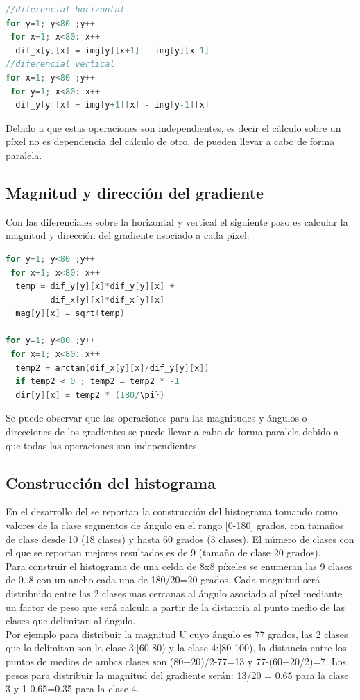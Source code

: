 \documentclass{article}
\begin{document}
\begin{lstlisting}[language=C, caption=Calculo de la imagen diferencial]
//diferencial horizontal
for y=1; y<80 ;y++
 for x=1; x<80: x++
  dif_x[y][x] = img[y][x+1] - img[y][x-1]
//diferencial vertical
for x=1; y<80 ;y++
 for y=1; x<80: x++
  dif_y[y][x] = img[y+1][x] - img[y-1][x]  

\end{lstlisting}
Debido a que estas operaciones son independientes, es decir el cálculo sobre un píxel no es dependencia del cálculo de otro, de pueden llevar a cabo de forma paralela.

\subsection*{Magnitud y dirección del gradiente}
Con las diferenciales sobre la horizontal y vertical el siguiente paso es calcular la magnitud y dirección del gradiente asociado a cada píxel. 

\begin{lstlisting}[language=C, caption=Calculo de la imagen magnitud y direcciones]
for y=1; y<80 ;y++
 for x=1; x<80: x++
  temp = dif_y[y][x]*dif_y[y][x] +
         dif_x[y][x]*dif_x[y][x]
  mag[y][x] = sqrt(temp)

for y=1; y<80 ;y++
 for x=1; x<80: x++
  temp2 = arctan(dif_x[y][x]/dif_y[y][x])
  if temp2 < 0 ; temp2 = temp2 * -1 
  dir[y][x] = temp2 * (180/\pi})

\end{lstlisting}

Se puede observar que las operaciones para las magnitudes y ángulos o direcciones de los gradientes se puede llevar a cabo de forma paralela debido a que todas las operaciones son independientes 

\subsection*{Construcción del histograma}
En el desarrollo del \cite{dalal-triggs} se reportan la construcción del histograma tomando como valores de la clase segmentos de ángulo en el rango [0-180] grados, con tamaños de clase desde 10 (18 clases) y hasta 60 grados (3 clases). El número de clases con el que se reportan mejores resultados es de 9 (tamaño de clase 20 grados). \\

Para construir el histograma de una celda de 8x8 píxeles se enumeran las 9 clases de 0..8 con un ancho cada una de 180/20=20 grados.  Cada magnitud será distribuido entre las 2 clases mas cercanas al ángulo asociado al píxel mediante un factor de peso que será calcula a partir de la distancia al punto medio de  las clases que delimitan al ángulo.\\ 
Por ejemplo para distribuir la magnitud U cuyo ángulo es 77 grados, las 2 clases que lo delimitan son la clase 3:[60-80) y la clase 4:[80-100), la distancia entre los puntos de medios de ambas clases son (80+20)/2-77=13 y 77-(60+20/2)=7.  Los pesos para distribuir la magnitud del gradiente serán:  13/20 = 0.65 para la clase 3 y 1-0.65=0.35 para la clase 4. 
\end{document}
